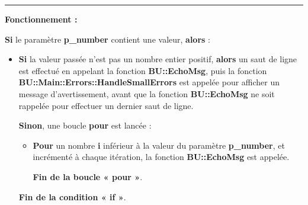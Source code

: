 \documentclass[a4paper,10pt]{article}
\begin{document}

\par\noindent\rule{\textwidth}{0.4pt}

\begin{justify}
    \textbf{Fonctionnement :}

    \textbf{\color{cond}Si} le paramètre \textbf{\color{vars}p\_number} contient une valeur, \textbf{\color{cond}alors} :
    
    \begin{itemize}
        \item
        {
            \begin{justify}
                \textbf{\color{cond}Si} la valeur passée n'est pas un nombre entier positif, \textbf{\color{cond}alors} un saut de ligne est effectué en appelant la fonction \textbf{\color{func}BU::EchoMsg}, puis la fonction \textbf{\color{func}BU::Main::Errors::HandleSmallErrors} est appelée pour afficher un message d'avertissement, avant que la fonction \textbf{\color{func}BU::EchoMsg} ne soit rappelée pour effectuer un dernier saut de ligne.
            \end{justify}

            \setlength{\parskip}{1em}

            \begin{justify}
                \textbf{\color{cond}Sinon}, une boucle \textbf{\color{loop}pour} est lancée :

                \begin{itemize}
                    \item
                    {
                        \begin{justify}
                            \textbf{\color{loop}Pour} un nombre \textbf{\color{vars}i} inférieur à la valeur du paramètre \textbf{\color{vars}p\_number}, et incrémenté à chaque itération, la fonction \textbf{\color{func}BU::EchoMsg} est appelée.
                        \end{justify}

                        \setlength{\parskip}{1em}

                        \begin{justify}
                            \textbf{\color{loop}Fin de la boucle « pour »}.
                        \end{justify}
                    }
                \end{itemize}
            \end{justify}
            
            \begin{justify}
                \textbf{\color{cond}Fin de la condition « if »}.
            \end{justify}
        }
    \end{itemize}
\end{justify}
\end{document}
